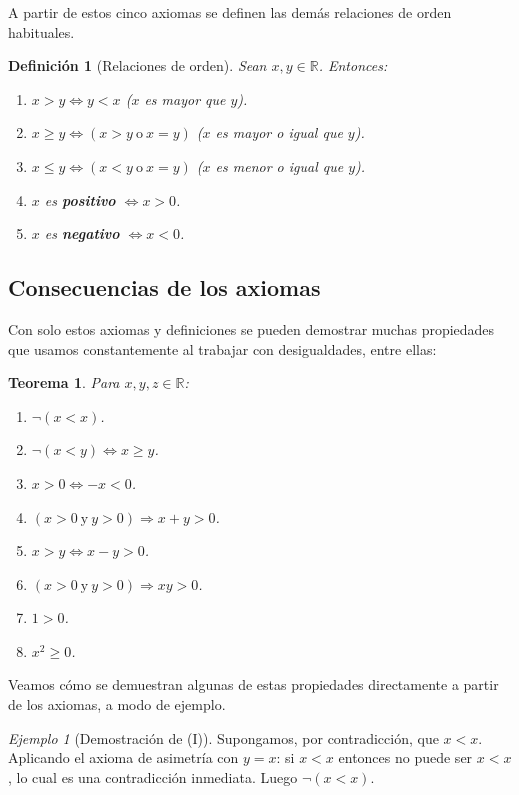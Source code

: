 \documentclass[11pt]{article}
\newtheorem{definicion}{Definición}[section]
\newtheorem{teorema}{Teorema}[section]
\theoremstyle{remark}
\newtheorem*{ejemplo}{Ejemplo}
\begin{document}
A partir de estos cinco axiomas se definen las demás relaciones de orden
habituales.

\begin{definicion}[Relaciones de orden]
Sean $x,y \in \mathbb{R}$. Entonces:
\begin{enumerate}[label=(\Roman*)]
\item $x>y \iff y<x$ \quad ($x$ es mayor que $y$).
\item $x\geq y \iff (x>y \ \text{o} \ x=y)$ \quad ($x$ es mayor o igual que $y$).
\item $x\leq y \iff (x<y \ \text{o} \ x=y)$ \quad ($x$ es menor o igual que $y$).
\item $x$ es \textbf{positivo} $\iff x>0$.
\item $x$ es \textbf{negativo} $\iff x<0$.
\end{enumerate}
\end{definicion}

\subsection{Consecuencias de los axiomas}

Con solo estos axiomas y definiciones se pueden demostrar muchas propiedades
que usamos constantemente al trabajar con desigualdades, entre ellas:

\begin{teorema}\label{teo:orden}
Para $x,y,z \in \mathbb{R}$:
\begin{enumerate}[label=(\Roman*)]
\item $\neg(x<x)$.
\item $\neg(x<y) \iff x \geq y$.
\item $x>0 \iff -x<0$.
\item $(x>0 \ \text{y} \ y>0) \Rightarrow x+y>0$.
\item $x>y \iff x-y>0$.
\item $(x>0 \ \text{y} \ y>0) \Rightarrow xy>0$.
\item $1>0$.
\item $x^2 \geq 0$.
\end{enumerate}
\end{teorema}

Veamos cómo se demuestran algunas de estas propiedades directamente a partir
de los axiomas, a modo de ejemplo.

\begin{ejemplo}[Demostración de (I)]
Supongamos, por contradicción, que $x<x$. Aplicando el axioma de asimetría
con $y=x$: si $x<x$ entonces no puede ser $x<x$, lo cual es una
contradicción inmediata. Luego $\neg(x<x)$.
\end{ejemplo}
\end{document}
